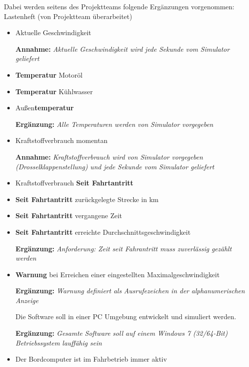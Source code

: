 \documentclass[a4paper,12pt]{article}
\begin{document}
Dabei werden seitens des Projektteams folgende Ergänzungen vorgenommen:\\

Lastenheft (von Projektteam überarbeitet)

\begin{itemize}

\item Aktuelle Geschwindigkeit

		\textbf{Annahme:} \emph{Aktuelle Geschwindigkeit wird jede Sekunde vom Simulator geliefert}

\item \textbf{Temperatur} Motoröl 
\item \textbf{Temperatur} Kühlwasser
\item Außen\textbf{temperatur}

		\textbf{Ergänzung:} \emph{Alle Temperaturen werden von Simulator vorgegeben}

\item Kraftstoffverbrauch momentan

		\textbf{Annahme:} \emph{Kraftstoffverbrauch wird von Simulator vorgegeben (Drosselklappenstellung) und jede Sekunde vom Simulator geliefert}

\item Kraftstoffverbrauch \textbf{Seit Fahrtantritt}
\item \textbf{Seit Fahrtantritt} zurückgelegte Strecke in km
\item \textbf{Seit Fahrtantritt} vergangene Zeit
\item \textbf{Seit Fahrtantritt} erreichte Durchschnittsgeschwindigkeit

		\textbf{Ergänzung:} \emph{Anforderung: Zeit seit Fahrantritt muss zuverlässig gezählt werden}

\item \textbf{Warnung} bei Erreichen einer eingestellten Maximalgeschwindigkeit

		\textbf{Ergänzung:} \emph{Warnung definiert als Ausrufezeichen in der alphanumerischen Anzeige}
		
Die Software soll in einer PC Umgebung entwickelt und simuliert werden.

\textbf{Ergänzung:} \emph{Gesamte Software soll auf einem Windows 7 (32/64-Bit) Betriebssystem lauffähig sein}


\item Der Bordcomputer ist im Fahrbetrieb immer aktiv


\end{itemize}
\end{document}
